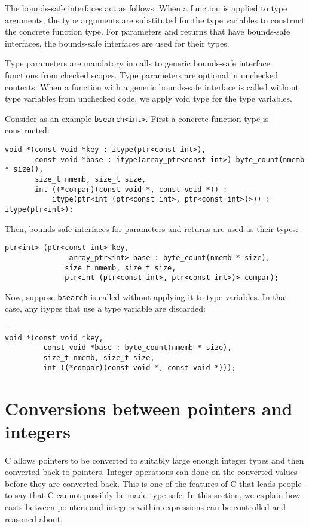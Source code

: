 The bounds-safe interfaces act as follows.  When a function 
is applied to type arguments, the type arguments are substituted
for the type variables to construct the concrete function type.
For parameters and returns that have bounds-safe interfaces, the
bounds-safe interfaces are used for their types.

Type parameters are mandatory in calls
to generic bounds-safe interface functions from checked scopes.
Type parameters are optional in unchecked contexts. When a 
function with a generic bounds-safe interface is called
without type variables from unchecked code, we apply void type
for the type variables.

Consider as an example \lstinline+bsearch<int>+.  First a concrete
function type is constructed:
\begin{lstlisting}
void *(const void *key : itype(ptr<const int>),
       const void *base : itype(array_ptr<const int>) byte_count(nmemb * size)),
       size_t nmemb, size_t size,
       int ((*compar)(const void *, const void *)) :
           itype(ptr<int (ptr<const int>, ptr<const int>)>)) : itype(ptr<int>);
\end{lstlisting}
Then, bounds-safe interfaces for parameters and returns are used as
their types:
\begin{lstlisting}
ptr<int> (ptr<const int> key,
               array_ptr<int> base : byte_count(nmemb * size),
              size_t nmemb, size_t size,
              ptr<int (ptr<const int>, ptr<const int>)> compar);
\end{lstlisting}
Now, suppose \lstinline+bsearch+ is called without applying it to type variables.
In that case, any itypes that use a type variable are discarded:
\begin{lstlisting}-
void *(const void *key,
         const void *base : byte_count(nmemb * size),
         size_t nmemb, size_t size,
         int ((*compar)(const void *, const void *)));
\end{lstlisting}

\section{Conversions between pointers and integers}
\label{section:pointer-integer-conversions}

C allows pointers to be converted to suitably large enough integer
types and then converted back to pointers.  Integer operations can
done on the converted values before they are converted back.
This is one of the features of C that leads people to 
say that C cannot possibly be made type-safe.  In this section,
we explain how casts between pointers and integers within 
expressions can be controlled and reasoned about.

